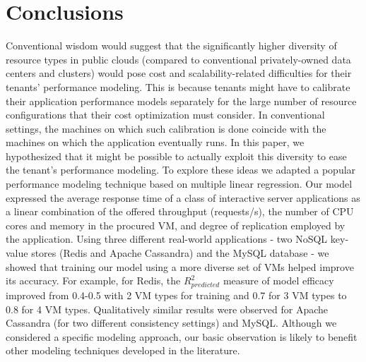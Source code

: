 
%
%

\section{Conclusions}
\label{sec:conclus}
\vspace{10pt}

Conventional wisdom would suggest that the significantly higher diversity of resource types in public clouds (compared to conventional privately-owned data centers and clusters) would pose cost and scalability-related difficulties for their tenants' performance modeling. This is because tenants might have to calibrate their application performance models separately for the large number of resource configurations that their cost optimization must consider. In conventional settings, the machines on which such calibration is done coincide with the machines on which the application eventually runs. In this paper, we hypothesized that it might be possible to actually exploit this diversity to ease the tenant's performance modeling.  To explore these ideas we adapted a popular performance modeling technique based on multiple linear regression. Our model expressed the average response time of a class of interactive server applications as a linear combination of the offered throughput (requests/s), the number of CPU cores and memory in the procured VM, and degree of replication employed by the application. Using three different real-world applications - two NoSQL key-value stores (Redis and Apache Cassandra) and the MySQL database -  we showed that training our model using a more diverse set of VMs helped improve its accuracy. %
For example, for Redis, the $R^2_{predicted}$ measure of model efficacy improved from 0.4-0.5 with 2 VM types for training and 0.7 for 3 VM types to 0.8 for 4 VM types. Qualitatively similar results were observed for Apache Cassandra (for two different consistency settings) and MySQL. 
Although we considered a specific modeling approach, our basic observation is likely to benefit other modeling techniques developed in the literature. 

